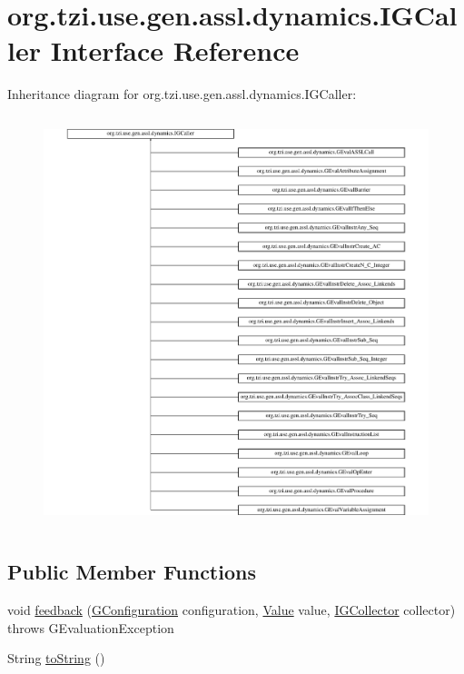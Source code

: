 \hypertarget{interfaceorg_1_1tzi_1_1use_1_1gen_1_1assl_1_1dynamics_1_1_i_g_caller}{\section{org.\-tzi.\-use.\-gen.\-assl.\-dynamics.\-I\-G\-Caller Interface Reference}
\label{interfaceorg_1_1tzi_1_1use_1_1gen_1_1assl_1_1dynamics_1_1_i_g_caller}
}
Inheritance diagram for org.\-tzi.\-use.\-gen.\-assl.\-dynamics.\-I\-G\-Caller\-:\begin{figure}[H]
\begin{center}
\leavevmode
\includegraphics[height=12.000000cm]{interfaceorg_1_1tzi_1_1use_1_1gen_1_1assl_1_1dynamics_1_1_i_g_caller}
\end{center}
\end{figure}
\subsection*{Public Member Functions}
\begin{DoxyCompactItemize}
\item 
void \hyperlink{interfaceorg_1_1tzi_1_1use_1_1gen_1_1assl_1_1dynamics_1_1_i_g_caller_a5d86832a783f44ce72eaacd64e207330}{feedback} (\hyperlink{classorg_1_1tzi_1_1use_1_1gen_1_1assl_1_1dynamics_1_1_g_configuration}{G\-Configuration} configuration, \hyperlink{classorg_1_1tzi_1_1use_1_1uml_1_1ocl_1_1value_1_1_value}{Value} value, \hyperlink{interfaceorg_1_1tzi_1_1use_1_1gen_1_1assl_1_1dynamics_1_1_i_g_collector}{I\-G\-Collector} collector)  throws G\-Evaluation\-Exception
\item 
String \hyperlink{interfaceorg_1_1tzi_1_1use_1_1gen_1_1assl_1_1dynamics_1_1_i_g_caller_a8dc6abb36ee44d8e73a0b506764bd1e1}{to\-String} ()
\end{DoxyCompactItemize}



